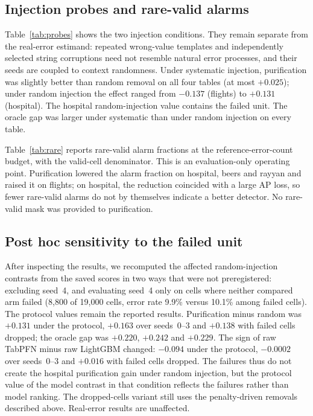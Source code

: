 \subsection{Injection probes and rare-valid alarms}
Table~\ref{tab:probes} shows the two injection conditions.
They remain separate from the real-error estimand: repeated wrong-value templates
and independently selected string corruptions need not resemble natural error
processes, and their seeds are coupled to context randomness. Under systematic
injection, purification was slightly better than random removal on all four tables
(at most $+0.025$); under random injection the effect ranged from $-0.137$ (flights)
to $+0.131$ (hospital). The hospital random-injection value contains the failed unit.
The oracle gap was larger under systematic than under random injection on every table.


Table~\ref{tab:rare} reports rare-valid alarm fractions at the reference-error-count
budget, with the valid-cell denominator. This is an evaluation-only operating point.
Purification lowered the alarm fraction on hospital, beers and rayyan and raised it
on flights; on hospital, the reduction coincided with a large AP loss, so fewer
rare-valid alarms do not by themselves indicate a better detector. No rare-valid
mask was provided to purification.


\subsection{Post hoc sensitivity to the failed unit}\label{sec:sens}
After inspecting the results, we recomputed the affected random-injection contrasts
from the saved scores in two ways that were not preregistered: excluding seed~4, and
evaluating seed~4 only on cells where neither compared arm failed (8,800 of 19,000
cells, error rate 9.9\% versus 10.1\% among failed cells). The protocol values remain
the reported results. Purification minus random was $+0.131$ under the protocol,
$+0.163$ over seeds~0--3 and $+0.138$ with failed cells dropped; the oracle gap was
$+0.220$, $+0.242$ and $+0.229$. The sign of raw TabPFN minus raw LightGBM changed:
$-0.094$ under the protocol, $-0.0002$ over seeds~0--3 and $+0.016$ with failed cells
dropped. The failures thus do not create the hospital purification gain under random
injection, but the protocol value of the model contrast in that condition reflects
the failures rather than model ranking. The dropped-cells variant still uses the
penalty-driven removals described above. Real-error results are unaffected.

